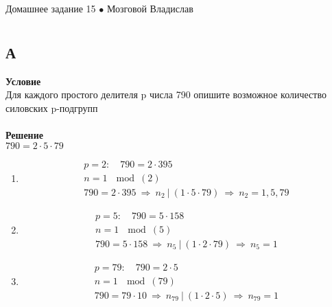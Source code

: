 \newpage
	{\large \hspace{3cm} \begin{center} Домашнее задание 15 $\bullet$ Мозговой Владислав \end{center} }
	\vspace{-1.5ex}
	\hrulefill
	
	\fontsize{12pt}{4.5mm}\selectfont
	\vspace{-3ex}
	\hrulefill
	\newline

	\section{}
		\subsection*{А}
		\textbf{Условие}\\
		Для каждого простого делителя p числа 790 опишите возможное количество силовских p-подгрупп\\
		\\
		\textbf{Решение}\\
		$790 = 2 \cdot 5 \cdot 79$\\
		\begin{enumerate}
			\item
			\begin{gather*}
				p = 2:\quad 790 = 2 \cdot 395\\
				n = 1\ \mod(2)\\
				790 = 2 \cdot 395\ \Rightarrow\ n_2\ |\ (1 \cdot 5 \cdot 79)\ \Rightarrow\ n_2 = 1,5,79
			\end{gather*}
			
			\item
			\begin{gather*}
				p = 5:\quad 790 = 5 \cdot 158\\
				n = 1\ \mod(5)\\
				790 = 5 \cdot 158\ \Rightarrow\ n_5\ |\ (1 \cdot 2 \cdot 79)\ \Rightarrow\ n_5 = 1
			\end{gather*}
			
			\item
			\begin{gather*}
				p = 79:\quad 790 = 2 \cdot 5\\
				n = 1\ \mod(79)\\
				790 = 79 \cdot 10\ \Rightarrow\ n_{79}\ |\ (1 \cdot 2 \cdot 5)\ \Rightarrow\ n_{79} = 1
			\end{gather*}
		\end{enumerate}		
		
